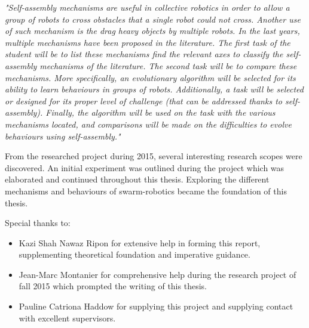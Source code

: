 \documentclass[a4paper,12pt,twoside,openright]{book}
\begin{document}
\begin{center}
	
	\textit{"Self-assembly mechanisms are useful in collective robotics in order to allow a group of robots to cross obstacles that a single robot could not cross. Another use of such mechanism is the drag heavy objects by multiple robots. In the last years,  multiple mechanisms have been proposed in the literature. The first task of the student will be to list these mechanisms find the relevant axes to classify the self-assembly mechanisms of the literature. The second task will be to compare these mechanisms. More specifically, an evolutionary algorithm will be selected for its ability to learn behaviours in groups of robots. Additionally, a task will be selected or designed for its proper level of challenge (that can be addressed thanks to self-assembly). Finally, the algorithm will be used on the task with the various mechanisms located, and comparisons will be made on the difficulties to evolve behaviours using self-assembly."\\}
	
\end{center}

From the researched project during 2015, several interesting research scopes were discovered.
An initial experiment was outlined during the project which was elaborated and continued throughout this thesis.
Exploring the different mechanisms and behaviours of swarm-robotics became the foundation of this thesis.

Special thanks to:

\begin{itemize}
	
	\item Kazi Shah Nawaz Ripon for extensive help in forming this report, supplementing theoretical foundation and imperative guidance.
	
	\item Jean-Marc Montanier for comprehensive help during the research project of fall 2015 which prompted the writing of this thesis.
	
	\item Pauline Catriona Haddow for supplying this project and supplying contact with excellent supervisors.

\end{itemize}

\tableofcontents

\newpage
\listoffigures
\newpage
\listoftables

\mainmatter
\pagestyle{main}
\end{document}
